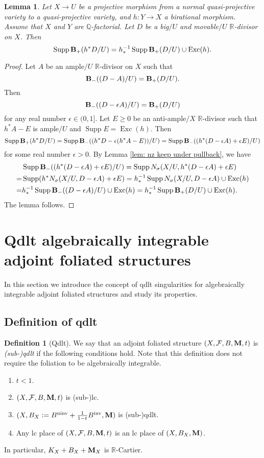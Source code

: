 \documentclass[12pt]{amsart}
\numberwithin{equation}{section}
\newcommand{\Mm}{{\bf{M}}}
\newcommand{\Qq}{\mathbb{Q}}
\newcommand{\Rr}{\mathbb{R}}
\newcommand{\Exc}{\operatorname{Exc}}
\newcommand{\ninv}{\operatorname{ninv}}
\newcommand{\inv}{\operatorname{inv}}
\newcommand{\Supp}{\operatorname{Supp}}
\newcommand{\Bb}{{\bf{B}}}
\newcommand{\Ff}{\mathcal{F}}
\newtheorem{lem}[thm]{Lemma}
\theoremstyle{definition}
\newtheorem{defn}[thm]{Definition}
\theoremstyle{definition}
\theoremstyle{definition}
\begin{document}
\begin{lem}\label{lem: sbl under pullback}
 Let $X\rightarrow U$ be a projective morphism from a normal quasi-projective variety to a quasi-projective variety, and $h: Y\rightarrow X$ a birational morphism. Assume that $X$ and $Y$ are $\Qq$-factorial. Let $D$ be a big$/U$ and movable$/U$ $\Rr$-divisor on $X$. Then
 $$\Supp\Bb_+(h^\ast D/U)=h^{-1}_\ast \Supp\Bb_+(D/U)\cup\Exc(h).$$
\end{lem}
\begin{proof}
    Let $A$ be an ample$/U$ $\Rr$-divisor on $X$ such that
    $$\Bb_-((D-A)/U)=\Bb_+(D/U).$$
    Then
    $$\Bb_-((D-\epsilon A)/U)=\Bb_+(D/U)$$
    for any real number $\epsilon\in (0,1]$. Let $E\geq 0$ be an anti-ample$/X$ $\Rr$-divisor such that $h^\ast A-E$ is ample$/U$ and $\Supp E=\Exc(h)$. Then
    $$\Supp\Bb_+(h^\ast D/U)=\Supp\Bb_-((h^\ast D-\epsilon(h^\ast A-E))/U)=\Supp\Bb_-((h^\ast (D-\epsilon A)+\epsilon E)/U)$$
    for some real number $\epsilon>0$. By Lemma \ref{lem: nz keep under pullback}, we have
\begin{align*}
 &\Supp\Bb_-((h^\ast (D-\epsilon A)+\epsilon E)/U)=\Supp N_{\sigma}(X/U,h^\ast (D-\epsilon A)+\epsilon E)\\
 =&\Supp(h^\ast N_{\sigma}(X/U,D-\epsilon A)+\epsilon E)=h^{-1}_\ast \Supp N_{\sigma}(X/U,D-\epsilon A)\cup\Exc(h)\\
 =&h^{-1}_\ast \Supp\Bb_-((D-\epsilon A)/U)\cup\Exc(h)=h^{-1}_\ast \Supp\Bb_+(D/U)\cup\Exc(h).
\end{align*}
The lemma follows.
\end{proof}



 \section{Qdlt algebraically integrable adjoint foliated structures}\label{sec: qdlt modification}

In this section we introduce the concept of qdlt singularities for algebraically integrable adjoint foliated structures and study its properties. 

\subsection{Definition of qdlt}

\begin{defn}[Qdlt]\label{defn: qdlt afs}
    We say that an adjoint foliated structure $(X,\Ff,B,\Mm,t)$ is \emph{(sub-)qdlt} if the following conditions hold. Note that this definition does not require the foliation to be algebraically integrable.
    \begin{enumerate}
        \item $t<1$.
        \item $(X,\Ff,B,\Mm,t)$ is (sub-)lc.
        \item $(X,B_X:=B^{\ninv}+\frac{1}{1-t}B^{\inv},\Mm)$ is (sub-)qdlt.
        \item Any lc place of $(X,\Ff,B,\Mm,t)$ is an lc place of $(X,B_X,\Mm)$.
    \end{enumerate}
     In particular, $K_X+B_X+\Mm_X$ is $\Rr$-Cartier.
\end{defn}
\end{document}
